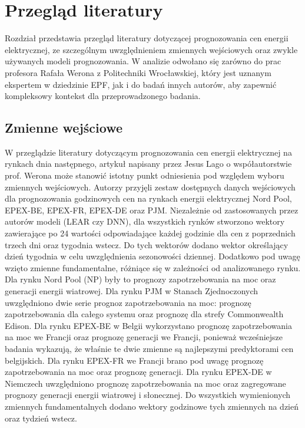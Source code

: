 \chapter{Przegląd literatury}
\label{ch:literatura}
Rozdział przedstawia przegląd literatury dotyczącej prognozowania cen energii elektrycznej, ze szczególnym uwzględnieniem zmiennych wejściowych oraz zwykle używanych modeli prognozowania. W analizie odwołano się zarówno do prac profesora Rafała Werona z Politechniki Wrocławskiej, który jest uznanym ekspertem w dziedzinie EPF, jak i do badań innych autorów, aby zapewnić kompleksowy kontekst dla przeprowadzonego badania.

\section{Zmienne wejściowe}
\label{sec:zmienne_wejsciowe_literatura}

W przeglądzie literatury dotyczącym prognozowania cen energii elektrycznej na rynkach dnia następnego, artykuł napisany przez Jesus Lago o współautorstwie prof. Werona \cite{LAGO2021116983} może stanowić istotny punkt odniesienia pod względem wyboru zmiennych wejściowych. Autorzy przyjęli zestaw dostępnych danych wejściowych dla prognozowania godzinowych cen na rynkach energii elektrycznej Nord Pool, EPEX-BE, EPEX-FR, EPEX-DE oraz PJM.
Niezależnie od zastosowanych przez autorów modeli (LEAR czy DNN), dla wszystkich rynków stworzono wektory zawierające po 24 wartości odpowiadające każdej godzinie dla cen z poprzednich trzech dni oraz tygodnia wstecz. Do tych wektorów dodano wektor określający dzień tygodnia w celu uwzględnienia sezonowości dziennej. Dodatkowo pod uwagę wzięto zmienne fundamentalne, różniące się w zależności od analizowanego rynku. \newline
Dla rynku Nord Pool (NP) były to prognozy zapotrzebowania na moc oraz generacji energii wiatrowej.\newline
Dla rynku PJM w Stanach Zjednoczonych uwzględniono dwie serie prognoz zapotrzebowania na moc: prognozę zapotrzebowania dla całego systemu oraz prognozę dla strefy Commonwealth Edison.\newline
Dla rynku EPEX-BE w Belgii wykorzystano prognozę zapotrzebowania na moc we Francji oraz prognozę generacji we Francji, ponieważ wcześniejsze badania wykazują, że właśnie te dwie zmienne są najlepszymi predyktorami cen belgijskich. \newline
Dla rynku EPEX-FR we Francji brano pod uwagę prognozę zapotrzebowania na moc oraz prognozę generacji.\newline
Dla rynku EPEX-DE w Niemczech uwzględniono prognozę zapotrzebowania na moc oraz zagregowane prognozy generacji energii wiatrowej i słonecznej.\newline
Do wszystkich wymienionych zmiennych fundamentalnych dodano wektory godzinowe tych zmiennych na dzień oraz tydzień wstecz.

